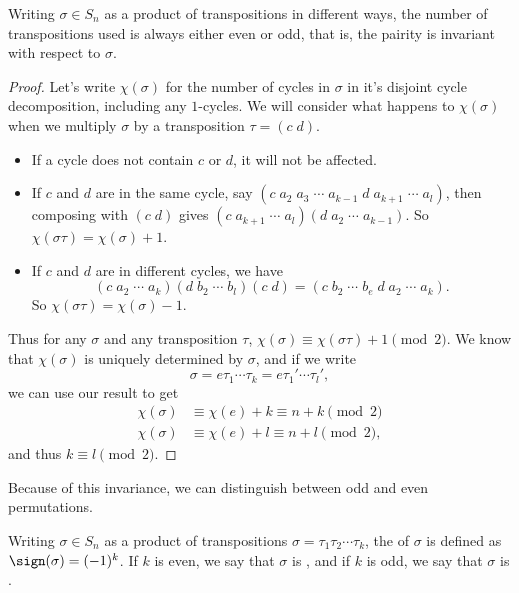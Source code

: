 \documentclass[a4]{scrreprt}
\begin{document}
\begin{theorem}
	Writing $\sigma \in S_n$ as a product of transpositions in different ways, the number of transpositions used is always either even or odd, that is, the pairity is invariant with respect to $\sigma$.
\end{theorem}
\begin{proof}
	Let's write $\chi(\sigma)$ for the number of cycles in $\sigma$ in it's disjoint cycle decomposition, including any $1$-cycles. We will consider what happens to $\chi(\sigma)$ when we multiply $\sigma$ by a transposition $\tau = (c \; d)$.
	\begin{itemize}
		\item If a cycle does not contain $c$ or $d$, it will not be affected.
		\item If $c$ and $d$ are in the same cycle, say $(c\; a_2\; a_3\; \cdots \; a_{k - 1} \; d \; a_{k + 1}\; \cdots \; a_l)$, then composing with $(c\; d)$ gives $(c\; a_{k + 1}\; \cdots \; a_l)(d\; a_2\; \cdots\; a_{k - 1})$. So $\chi(\sigma \tau) = \chi(\sigma) + 1$.
		\item If $c$ and $d$ are in different cycles, we have
		$$
		(c\; a_2\; \cdots\; a_k)(d\; b_2\; \cdots\; b_l)(c\; d) = (c \; b_2 \; \cdots\; b_e \; d \; a_2 \; \cdots \; a_k).
		$$
		So $\chi(\sigma \tau) = \chi(\sigma) - 1$.
	\end{itemize}
	Thus for any $\sigma$ and any transposition $\tau$, $\chi(\sigma) \equiv \chi(\sigma \tau) + 1 \pmod{2}$.
	We know that $\chi(\sigma)$ is uniquely determined by $\sigma$, and if we write
	$$
	\sigma = e\tau_1 \cdots \tau_k = e\tau_1 ' \cdots \tau_l ',
	$$
	we can use our result to get
	\begin{align*}
		\chi(\sigma) &\equiv \chi(e) + k \equiv n + k \pmod{2} \\
		\chi(\sigma) &\equiv \chi(e) + l \equiv n + l \pmod{2},
	\end{align*}
	and thus $k \equiv l \pmod{2}$.
\end{proof}

Because of this invariance, we can distinguish between odd and even permutations.
\begin{definition}
	Writing $\sigma \in S_n$ as a product of transpositions $\sigma = \tau_1 \tau_2 \cdots \tau_k$, the  of $\sigma$ is defined as $\sign(\sigma) = (-1)^k$. If $k$ is even, we say that $\sigma$ is , and if $k$ is odd, we say that $\sigma$ is .
\end{definition} 
\end{document}
